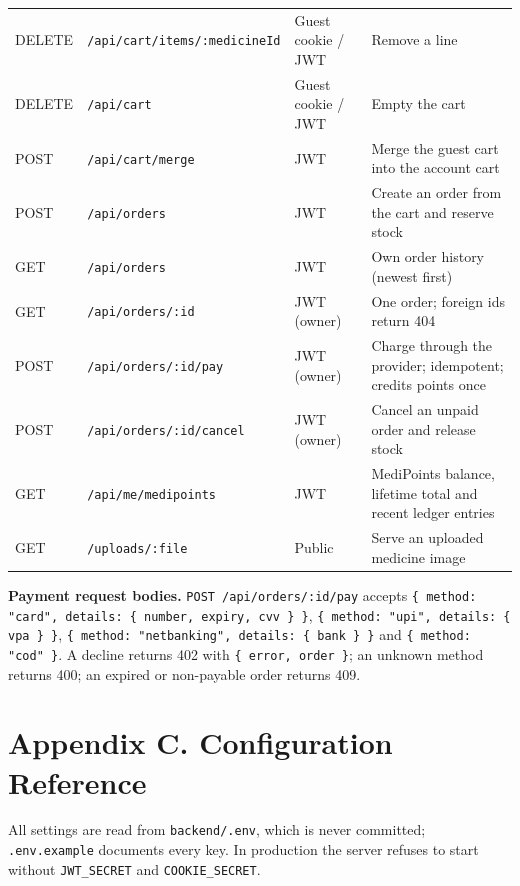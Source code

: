 \documentclass[11pt,a4paper]{article}
\begin{document}
{\begin{longtable}{@{}L{1.55cm}L{5.00cm}L{3.30cm}L{5.31cm}@{}}
DELETE & \texttt{/api/cart/items/:medicineId} & Guest cookie / JWT & Remove a line\\
DELETE & \texttt{/api/cart} & Guest cookie / JWT & Empty the cart\\
POST & \texttt{/api/cart/merge} & JWT & Merge the guest cart into the account cart\\
POST & \texttt{/api/orders} & JWT & Create an order from the cart and reserve stock\\
GET & \texttt{/api/orders} & JWT & Own order history (newest first)\\
GET & \texttt{/api/orders/:id} & JWT (owner) & One order; foreign ids return 404\\
POST & \texttt{/api/orders/:id/pay} & JWT (owner) & Charge through the provider; idempotent; credits points once\\
POST & \texttt{/api/orders/:id/cancel} & JWT (owner) & Cancel an unpaid order and release stock\\
GET & \texttt{/api/me/medipoints} & JWT & MediPoints balance, lifetime total and recent ledger entries\\
GET & \texttt{/uploads/:file} & Public & Serve an uploaded medicine image\\
\end{longtable}
}

\noindent\textbf{Payment request bodies.} \texttt{POST /api/orders/:id/pay} accepts
\texttt{\{ method: "card", details: \{ number, expiry, cvv \} \}},
\texttt{\{ method: "upi", details: \{ vpa \} \}},
\texttt{\{ method: "netbanking", details: \{ bank \} \}} and
\texttt{\{ method: "cod" \}}. A decline returns 402 with \texttt{\{ error, order \}};
an unknown method returns 400; an expired or non-payable order returns 409.

\clearpage
{}
\section*{Appendix C. Configuration Reference}

All settings are read from \texttt{backend/.env}, which is never committed;
\texttt{.env.example} documents every key. In production the server refuses to start
without \texttt{JWT\_SECRET} and \texttt{COOKIE\_SECRET}.
\end{document}
